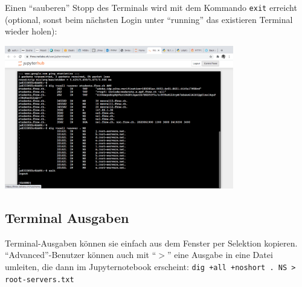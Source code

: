 \documentclass[]{scrartcl}
\begin{document}
Einen ``sauberen'' Stopp des Terminals wird mit dem Kommando \texttt{exit} erreicht (optional, sonst beim n\"achsten Login unter ``running'' das existieren Terminal wieder holen):

\includegraphics[width=10cm]{jupyterhub/jupyterhub_terminal_exit}


\subsection*{Terminal Ausgaben}
Terminal-Ausgaben k\"onnen sie einfach aus dem Fenster per Selektion kopieren. ``Advanced''-Benutzer k\"onnen auch mit ``$>$'' eine Ausgabe in eine Datei umleiten, die dann im Jupyternotebook erscheint: \texttt{dig +all +noshort . NS > root-servers.txt}
\end{document}
